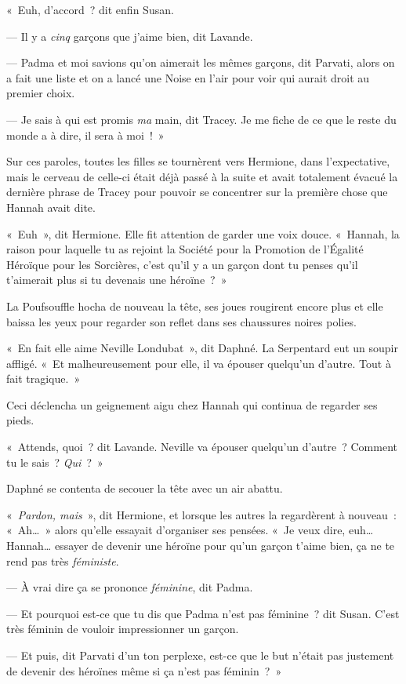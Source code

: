 «~Euh, d'accord~? dit enfin Susan.

--- Il y a \emph{cinq} garçons que j'aime bien, dit Lavande.

--- Padma et moi savions qu'on aimerait les mêmes garçons, dit Parvati, alors on a fait une liste et on a lancé une Noise en l'air pour voir qui aurait droit au premier choix.

--- Je sais à qui est promis \emph{ma} main, dit Tracey. Je me fiche de ce que le reste du monde a à dire, il sera à moi~!~»

Sur ces paroles, toutes les filles se tournèrent vers Hermione, dans l'expectative, mais le cerveau de celle-ci était déjà passé à la suite et avait totalement évacué la dernière phrase de Tracey pour pouvoir se concentrer sur la première chose que Hannah avait dite.

«~Euh~», dit Hermione. Elle fit attention de garder une voix douce. «~Hannah, la raison pour laquelle tu as rejoint la Société pour la Promotion de l'Égalité Héroïque pour les Sorcières, c'est qu'il y a un garçon dont tu penses qu'il t'aimerait plus si tu devenais une héroïne~?~»

La Poufsouffle hocha de nouveau la tête, ses joues rougirent encore plus et elle baissa les yeux pour regarder son reflet dans ses chaussures noires polies.

«~En fait elle aime Neville Londubat~», dit Daphné. La Serpentard eut un soupir affligé. «~Et malheureusement pour elle, il va épouser quelqu'un d'autre. Tout à fait tragique.~»

Ceci déclencha un geignement aigu chez Hannah qui continua de regarder ses pieds.

«~Attends, quoi~? dit Lavande. Neville va épouser quelqu'un d'autre~? Comment tu le sais~? \emph{Qui}~?~»

Daphné se contenta de secouer la tête avec un air abattu.

«~\emph{Pardon, mais}~», dit Hermione, et lorsque les autres la regardèrent à nouveau~: «~Ah…~» alors qu'elle essayait d'organiser ses pensées. «~Je veux dire, euh… Hannah… essayer de devenir une héroïne pour qu'un garçon t'aime bien, ça ne te rend pas très \emph{féministe}.

--- À vrai dire ça se prononce \emph{féminine}, dit Padma.

--- Et pourquoi est-ce que tu dis que Padma n'est pas féminine~? dit Susan. C'est très féminin de vouloir impressionner un garçon.

--- Et puis, dit Parvati d'un ton perplexe, est-ce que le but n'était pas justement de devenir des héroïnes même si ça n'est pas féminin~?~»

